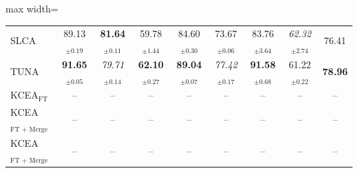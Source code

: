 \begin{table}[!t]
\begin{adjustbox}{max width=\textwidth}
\begin{tabular}{l c c c c c c c c}
SLCA & 89.13$_{\pm 0.19}$ & \textbf{81.64}$_{\pm 0.11}$ & 59.78$_{\pm 1.44}$ & 84.60$_{\pm 0.30}$ & 73.67$_{\pm 0.06}$ & 83.76$_{\pm 3.64}$ & \textit{62.32}$_{\pm 2.74}$ & 76.41 \\
TUNA & \textbf{91.65}$_{\pm 0.05}$ & \textit{79.71}$_{\pm 0.14}$ & \textbf{62.10}$_{\pm 0.27}$ & \textbf{89.04}$_{\pm 0.07}$ & \textit{77.42}$_{\pm 0.17}$ & \textbf{91.58}$_{\pm 0.68}$ & 61.22$_{\pm 0.22}$ & \textbf{78.96} \\
\midrule
KCEA$_{\text{FT}}$ & -- & -- & -- & -- & -- & -- & -- & -- \\
KCEA$_{\text{FT + Merge}}$ & -- & -- & -- & -- & -- & -- & -- & -- \\
KCEA$_{\text{FT + Merge + Align}}$ & -- & -- & -- & -- & -- & -- & -- & -- \\
\bottomrule
\end{tabular}
\end{adjustbox}
\end{table}